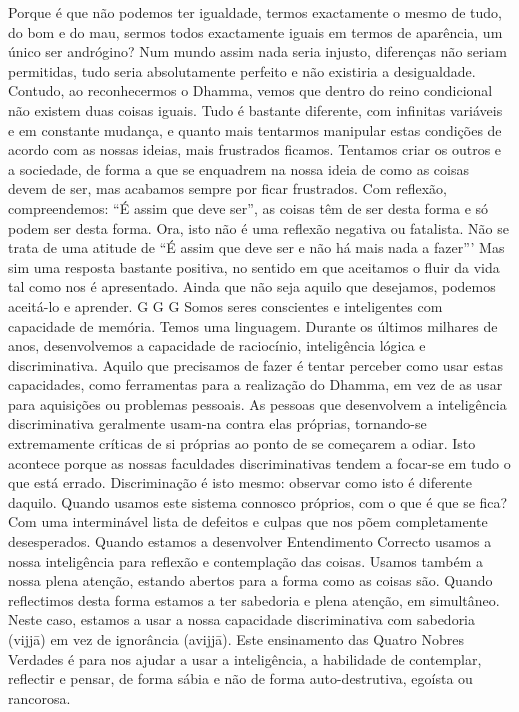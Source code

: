 Porque é que não podemos ter igualdade, termos exactamente o mesmo de tudo, do bom e do mau, sermos todos
exactamente iguais em termos de aparência, um único ser
andrógino? Num mundo assim nada seria injusto, diferenças
não seriam permitidas, tudo seria absolutamente perfeito e
não existiria a desigualdade. Contudo, ao reconhecermos o
Dhamma, vemos que dentro do reino condicional não existem
duas coisas iguais. Tudo é bastante diferente, com infinitas
variáveis e em constante mudança, e quanto mais tentarmos
manipular estas condições de acordo com as nossas ideias,
mais frustrados ficamos. Tentamos criar os outros e a
sociedade, de forma a que se enquadrem na nossa ideia de
como as coisas devem de ser, mas acabamos sempre por ficar
frustrados. Com reflexão, compreendemos: “É assim que
deve ser”, as coisas têm de ser desta forma e só podem ser
desta forma.
Ora, isto não é uma reflexão negativa ou fatalista. Não se
trata de uma atitude de “É assim que deve ser e não há mais
nada a fazer”' Mas sim uma resposta bastante positiva, no
sentido em que aceitamos o fluir da vida tal como nos é apresentado. Ainda que não seja aquilo que desejamos, podemos
aceitá-lo e aprender.
G G G
Somos seres conscientes e inteligentes com capacidade
de memória. Temos uma linguagem. Durante os últimos
milhares de anos, desenvolvemos a capacidade de raciocínio,
inteligência lógica e discriminativa. Aquilo que precisamos
de fazer é tentar perceber como usar estas capacidades, como
ferramentas para a realização do Dhamma, em vez de as usar
para aquisições ou problemas pessoais. As pessoas que
desenvolvem a inteligência discriminativa geralmente usam-na
contra elas próprias, tornando-se extremamente críticas de si
próprias ao ponto de se começarem a odiar. Isto acontece
porque as nossas faculdades discriminativas tendem a focar-se
em tudo o que está errado. Discriminação é isto mesmo:
observar como isto é diferente daquilo. Quando usamos este
sistema connosco próprios, com o que é que se fica? Com
uma interminável lista de defeitos e culpas que nos põem
completamente desesperados.
Quando estamos a desenvolver Entendimento Correcto
usamos a nossa inteligência para reflexão e contemplação das
coisas. Usamos também a nossa plena atenção, estando abertos
para a forma como as coisas são. Quando reflectimos desta
forma estamos a ter sabedoria e plena atenção, em simultâneo.
Neste caso, estamos a usar a nossa capacidade discriminativa
com sabedoria (vijjā) em vez de ignorância (avijjā). Este
ensinamento das Quatro Nobres Verdades é para nos ajudar a
usar a inteligência, a habilidade de contemplar, reflectir e
pensar, de forma sábia e não de forma auto-destrutiva, egoísta
ou rancorosa.


